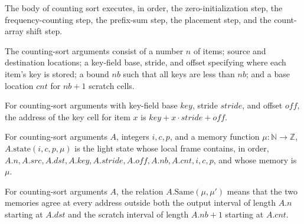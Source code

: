 \begin{definition}
\label{Light.countSortBody}
\leanok
{}
The body of counting sort executes, in order, the zero-initialization step, the
frequency-counting step, the prefix-sum step, the placement step, and the count-array
shift step.
\end{definition}

\begin{definition}
\label{Light.CountSort.Args}
\leanok
The counting-sort arguments consist of a number $n$ of items; source and destination
locations; a key-field base, stride, and offset specifying where each item's key is
stored; a bound $nb$ such that all keys are less than $nb$; and a base location $cnt$
for $nb+1$ scratch cells.
\end{definition}

\begin{definition}
\label{Light.CountSort.Args.keyCell}
\leanok
{}
For counting-sort arguments with key-field base $key$, stride $stride$, and offset
$off$, the address of the key cell for item $x$ is $key+x\cdot stride+off$.
\end{definition}

\begin{definition}
\label{Light.CountSort.Args.state}
\leanok
{}
For counting-sort arguments $A$, integers $i,c,p$, and a memory function $\mu:\mathbb{N}\to\mathbb{Z}$,
$A.\mathrm{state}(i,c,p,\mu)$ is the light state whose local frame contains, in order,
$A.n,A.src,A.dst,A.key,A.stride,A.off,A.nb,A.cnt,i,c,p$, and whose memory is $\mu$.
\end{definition}

\begin{definition}
\label{Light.CountSort.Args.Same}
\leanok
{}
For counting-sort arguments $A$, the relation $A.\mathrm{Same}(\mu,\mu\prime)$ means that
the two memories agree at every address outside both the output interval of length $A.n$
starting at $A.dst$ and the scratch interval of length $A.nb+1$ starting at $A.cnt$.
\end{definition}

